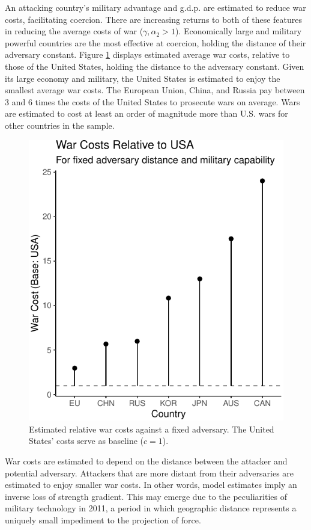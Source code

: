 \documentclass{puthesis}
\begin{document}
An attacking country's military advantage and g.d.p. are estimated to
reduce war costs, facilitating coercion. There are increasing returns to
both of these features in reducing the average costs of war
(\(\gamma, \alpha_2 > 1\)). Economically large and military powerful
countries are the most effective at coercion, holding the distance of
their adversary constant. Figure \ref{fig:war_costs} displays estimated
average war costs, relative to those of the United States, holding the
distance to the adversary constant. Given its large economy and
military, the United States is estimated to enjoy the smallest average
war costs. The European Union, China, and Russia pay between 3 and 6
times the costs of the United States to prosecute wars on average. Wars
are estimated to cost at least an order of magnitude more than U.S. wars
for other countries in the sample.

\begin{figure}
\centering
\includegraphics{figure/war_costs-1.pdf}
\caption{Estimated relative war costs against a fixed adversary. The
United States' costs serve as baseline (\(c=1\)). \label{fig:war_costs}}
\end{figure}

War costs are estimated to depend on the distance between the attacker
and potential adversary. Attackers that are more distant from their
adversaries are estimated to enjoy smaller war costs. In other words,
model estimates imply an inverse loss of strength gradient. This may
emerge due to the peculiarities of military technology in 2011, a period
in which geographic distance represents a uniquely small impediment to
the projection of force.
\end{document}

